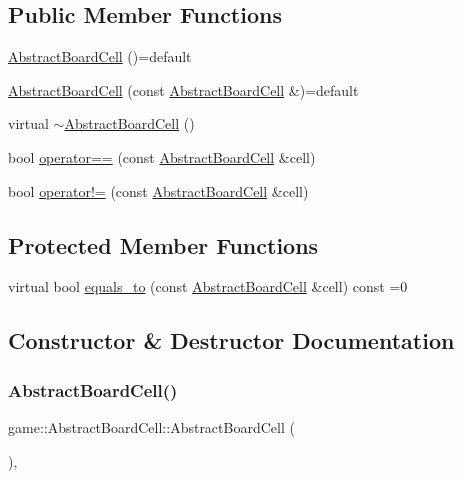 \subsection*{Public Member Functions}
\begin{DoxyCompactItemize}
\item 
\hyperlink{classgame_1_1_abstract_board_cell_a7270efe993a1dfeafc93b41b21590b18}{Abstract\+Board\+Cell} ()=default
\item 
\hyperlink{classgame_1_1_abstract_board_cell_ae4e615cb466fa0ce4fa028c8f840e065}{Abstract\+Board\+Cell} (const \hyperlink{classgame_1_1_abstract_board_cell}{Abstract\+Board\+Cell} \&)=default
\item 
virtual \hyperlink{classgame_1_1_abstract_board_cell_a5b1ce48a00a25ad6485af754f3c57b66}{$\sim$\+Abstract\+Board\+Cell} ()
\item 
bool \hyperlink{classgame_1_1_abstract_board_cell_ad2e86ef567d46428275e9eb4372d788f}{operator==} (const \hyperlink{classgame_1_1_abstract_board_cell}{Abstract\+Board\+Cell} \&cell)
\item 
bool \hyperlink{classgame_1_1_abstract_board_cell_a4a649f51a349dad0246fed9e8faee922}{operator!=} (const \hyperlink{classgame_1_1_abstract_board_cell}{Abstract\+Board\+Cell} \&cell)
\end{DoxyCompactItemize}
\subsection*{Protected Member Functions}
\begin{DoxyCompactItemize}
\item 
virtual bool \hyperlink{classgame_1_1_abstract_board_cell_a3939330bed75f3a408af228e86ec93af}{equals\+\_\+to} (const \hyperlink{classgame_1_1_abstract_board_cell}{Abstract\+Board\+Cell} \&cell) const =0
\end{DoxyCompactItemize}


\subsection{Constructor \& Destructor Documentation}
\mbox{\label{classgame_1_1_abstract_board_cell_a7270efe993a1dfeafc93b41b21590b18}} 
\subsubsection{\texorpdfstring{Abstract\+Board\+Cell()}{AbstractBoardCell()}\hspace{0.1cm}{\footnotesize\ttfamily [1/2]}}
{\footnotesize\ttfamily game\+::\+Abstract\+Board\+Cell\+::\+Abstract\+Board\+Cell (\begin{DoxyParamCaption}{ }\end{DoxyParamCaption})\hspace{0.3cm}{\ttfamily [explicit]}, {\ttfamily [default]}}


